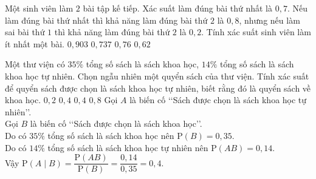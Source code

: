 \begin{ex}%
	Một sinh viên làm $2$ bài tập kế tiếp. Xác suất làm đúng bài thứ nhất là $0{,}7$. Nếu làm đúng bài thứ nhất thì khả năng làm đúng bài thứ $2$ là $0{,}8$, nhưng nếu làm sai bài thứ $1$ thì khả năng làm đúng bài thứ $2$ là $0{,}2$. Tính xác suất sinh viên làm ít nhất một bài.
	\choice
	{$ 0{,}903$}
	{$0{,}737$}
	{\True $0{,}76$}
	{$0{,}62$}
\end{ex}

\begin{ex}%
	Một thư viện có $35\%$ tổng số sách là sách khoa học, $14\%$ tổng số sách là sách khoa học tự nhiên. Chọn ngẫu nhiên một quyển sách của thư viện. Tính xác suất để quyển sách được chọn là sách khoa học tự nhiên, biết rằng đó là quyển sách về khoa học.
	\choice
	{$0{,}2$}
	{\True $0{,}4$}
	{$0,{4}$}
	{$0{,}8$}
	\loigiai
	{Gọi $A$ là biến cố \lq\lq Sách được chọn là sách khoa học tự nhiên\rq\rq.\\
		Gọi $B$ là biến cố \lq\lq Sách được chọn là sách khoa học\rq\rq.\\
		Do có $35\%$ tổng số sách là sách khoa học nên $\mathrm{P}(B)=0{,}35$.\\
		Do có $14\%$ tổng số sách là sách khoa học tự nhiên nên $\mathrm{P}(AB)=0{,}14$.\\
		Vậy $\mathrm{P}(A\mid B)=\dfrac{\mathrm{P}(AB)}{\mathrm{P}(B)}=\dfrac{0{,}14}{0{,}35}=0{,}4$.
	}
\end{ex}

